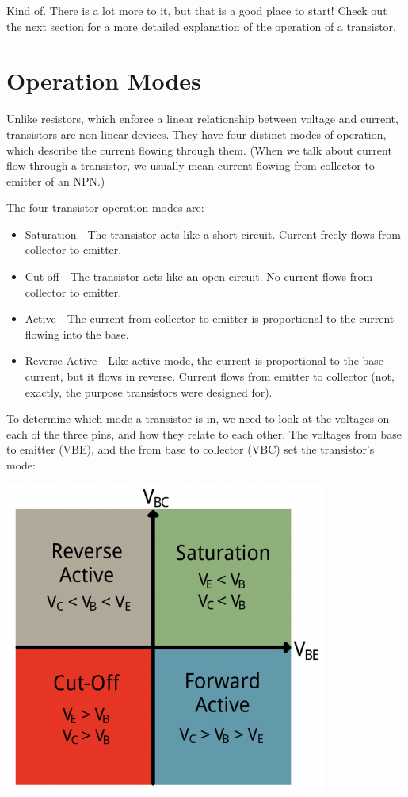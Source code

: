 \documentclass[a4paper, 11pt]{article} %
\begin{document}
Kind of. There is a lot more to it, but that is a good place to start! Check out the next section for a more detailed explanation of the operation of a transistor.

\section*{Operation Modes}

Unlike resistors, which enforce a linear relationship between voltage and current, transistors are non-linear devices. They have four distinct modes of operation, which describe the current flowing through them. (When we talk about current flow through a transistor, we usually mean current flowing from collector to emitter of an NPN.)

The four transistor operation modes are:

\begin{itemize}
\item Saturation - The transistor acts like a short circuit. Current freely flows from collector to emitter.
\item Cut-off - The transistor acts like an open circuit. No current flows from collector to emitter.
\item Active - The current from collector to emitter is proportional to the current flowing into the base.
\item Reverse-Active - Like active mode, the current is proportional to the base current, but it flows in reverse. Current flows from emitter to collector (not, exactly, the purpose transistors were designed for).
\end{itemize}

To determine which mode a transistor is in, we need to look at the voltages on each of the three pins, and how they relate to each other. The voltages from base to emitter (VBE), and the from base to collector (VBC) set the transistor's mode:

\begin{center}
\includegraphics[width=300pt]{tran10}
\end{center}
\end{document}
